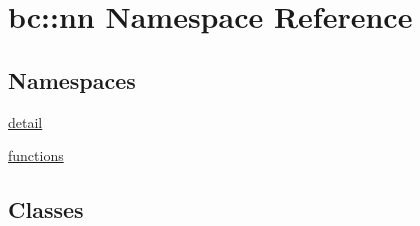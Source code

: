 \hypertarget{namespacebc_1_1nn}{}\section{bc\+:\+:nn Namespace Reference}
\label{namespacebc_1_1nn}
\subsection*{Namespaces}
\begin{DoxyCompactItemize}
\item 
 \hyperlink{namespacebc_1_1nn_1_1detail}{detail}
\item 
 \hyperlink{namespacebc_1_1nn_1_1functions}{functions}
\end{DoxyCompactItemize}
\subsection*{Classes}
